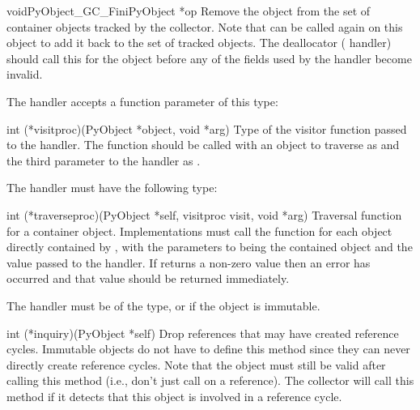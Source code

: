 \documentclass{manual}
\begin{document}
\begin{cfuncdesc}{void}{PyObject_GC_Fini}{PyObject *op}
  Remove the object  from the set of container objects tracked
  by the collector.  Note that  can be
  called again on this object to add it back to the set of tracked
  objects.  The deallocator ( handler) should call
  this for the object before any of the fields used by the
   handler become invalid.
\end{cfuncdesc}

The  handler accepts a function parameter of this
type:

\begin{ctypedesc}[visitproc]{int (*visitproc)(PyObject *object, void *arg)}
  Type of the visitor function passed to the 
  handler.  The function should be called with an object to traverse
  as  and the third parameter to the 
  handler as .
\end{ctypedesc}

The  handler must have the following type:

\begin{ctypedesc}[traverseproc]{int (*traverseproc)(PyObject *self,
                                visitproc visit, void *arg)}
  Traversal function for a container object.  Implementations must
  call the  function for each object directly contained by
  , with the parameters to  being the contained
  object and the  value passed to the handler.  If
   returns a non-zero value then an error has occurred and
  that value should be returned immediately.
\end{ctypedesc}

The  handler must be of the  type, or
\NULL{} if the object is immutable.

\begin{ctypedesc}[inquiry]{int (*inquiry)(PyObject *self)}
  Drop references that may have created reference cycles.  Immutable
  objects do not have to define this method since they can never
  directly create reference cycles.  Note that the object must still
  be valid after calling this method (i.e., don't just call
   on a reference).  The collector will call
  this method if it detects that this object is involved in a
  reference cycle.
\end{ctypedesc}
\end{document}
